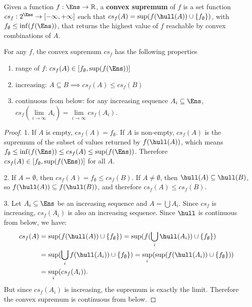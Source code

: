 \begin{mathSection}
\begin{defn}
	Given a function $f : \Ens \to \mathbb{R}$, a \textbf{convex supremum} of $f$ is a set function $cs_f : 2^{\Ens} \to [- \infty, + \infty]$ such that $cs_f(A) = \sup(f(\hull(A)) \cup \{f_{\emptyset}\})$, with $f_{\emptyset} \leq \inf(f(\Ens))$, that returns the highest value of $f$ reachable by convex combinations of $A$.
\end{defn}

\begin{prop}\label{pm-es-convexSupremumProps}
	For any $f$, the convex supremum $cs_f$ has the following properties
	\begin{enumerate}
		\item range of $f$: $cs_f(A) \in [f_{\emptyset}, \sup(f(\Ens))]$
		\item increasing: $A \subseteq B \implies cs_f(A) \leq cs_f(B)$
		\item continuous from below: for any increasing sequence $A_i \subseteq \Ens$, $cs_f(\lim\limits_{i \to \infty} A_i) = \lim\limits_{i \to \infty} cs_f(A_i)$.
	\end{enumerate}
\end{prop}

\begin{proof}
	1. If $A$ is empty, $cs_f(A) = f_{\emptyset}$. If $A$ is non-empty, $cs_f(A)$ is the supremum of the subset of values returned by $f(\hull(A))$, which means $f_{\emptyset} \leq \inf(f(\Ens)) \leq cs_f(A) \leq \sup(f(\Ens))$. Therefore $cs_f(A) \in [f_{\emptyset}, \sup(f(\Ens))]$ for all $A$.

	2. If $A=\emptyset$, then $cs_f(A)=f_{\emptyset}\leq cs_f(B)$. If $A\neq\emptyset$, then $\hull(A)\subseteq\hull(B)$, so $f(\hull(A))\subseteq f(\hull(B))$, and therefore $cs_f(A)\leq cs_f(B)$.
	
	3. Let $A_i \subseteq \Ens$ be an increasing sequence and $A = \bigcup A_i$. Since $cs_f$ is increasing, $cs_f(A_i)$ is also an increasing sequence. Since $\hull$ is continuous from below, we have:
	\begin{equation}
		\begin{aligned}
			cs_f(A) &= \sup(f(\hull(A))\cup\{f_{\emptyset}\}) = \sup(f(\bigcup_i\hull(A_i))\cup\{f_{\emptyset}\})\\
			&= \sup(\bigcup_i f(\hull(A_i))\cup\{f_{\emptyset}\}) = \sup_i(\sup(f(\hull(A_i))\cup\{f_{\emptyset}\})) \\
			&= \sup_i(cs_f(A_i)).
		\end{aligned}
	\end{equation}
	But since $cs_f(A_i)$ is increasing, the supremum is exactly the limit. Therefore the convex supremum is continuous from below.
\end{proof}


\end{mathSection}
